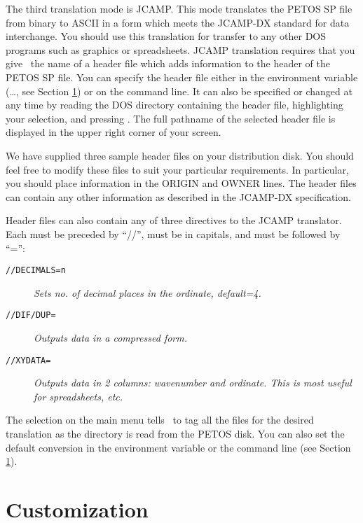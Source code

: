 \begin{itemize}
The third translation mode is JCAMP.  This mode translates the PETOS
SP file from binary to ASCII in a form which meets the JCAMP-DX
standard for data interchange.  You should use this translation for
transfer to any other DOS programs such as graphics or spreadsheets.
JCAMP translation requires that you give \RD\ the name of a header
file which adds information to the header of the PETOS SP file.  You
can specify the header file either in the environment variable
(\ldots, see Section \ref{sec-cust}) or on the command
line.  It can also be specified or changed at any time by reading the
DOS directory containing the header file, highlighting your selection,
and pressing .  The full pathname of the selected
header file is displayed in the upper right corner of your screen.

We have supplied three sample header files on your distribution disk.
You should feel free to modify these files to suit your particular
requirements.  In particular, you should place information in the
ORIGIN and OWNER lines.  The header files can contain any other
information as described in the JCAMP-DX specification.

Header files can also contain any of three directives to the JCAMP
translator. Each must be preceded by ``//'', must be in capitals, and
must be followed by ``='':

\begin{description}
\item[\tt //DECIMALS=n]\nl
          {\em Sets no. of decimal places in the ordinate, default=4.}
\item[\tt //DIF/DUP=]\nl
            {\em Outputs data in a compressed form.}
\item[\tt //XYDATA=]\nl
              {\em Outputs data in 2 columns: wavenumber and ordinate.
              This is most useful for spreadsheets, etc.}
\end{description}

The  selection on the main menu tells \RD\ to tag
all the  files for the desired translation as the directory
is read from the PETOS disk.  You can also set the default conversion in
the environment variable or the command line (see Section \ref{sec-cust}).

 
\section{Customization}
\label{sec-cust} 


\end{itemize}
